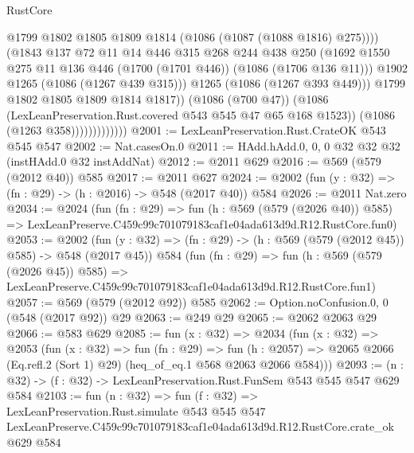\begin{lexlean}{RustCore}
\begin{coremodule}
                                    @1799
                                    @1802
                                    @1805
                                    @1809
                                    @1814
                                    (@1086 (@1087 (@1088 @1816) @275))))
                                (@1843
                                  @137
                                  @72
                                  @11
                                  @14
                                  @446
                                  @315
                                  @268
                                  @244
                                  @438
                                  @250
                                  (@1692
                                    @1550
                                    @275
                                    @11
                                    @136
                                    @446
                                    (@1700 (@1701 @446))
                                    (@1086 (@1706 @136 @11)))
                                  @1902
                                  @1265
                                  (@1086 (@1267 @439 @315)))
                                @1265
                                (@1086 (@1267 @393 @449)))
                              @1799
                              @1802
                              @1805
                              @1809
                              @1814
                              @1817))
                          (@1086 (@700 @47))
                          (@1086 (LexLeanPreservation.Rust.covered @543 @545 @47 @65 @168 @1523))
                          (@1086 (@1263 @358)))))))))))))
@2001 := LexLeanPreservation.Rust.CrateOK @543 @545 @547
@2002 := Nat.casesOn.{0}
@2011 := HAdd.hAdd.{0, 0, 0} @32 @32 @32 (instHAdd.{0} @32 instAddNat)
@2012 := @2011 @629
@2016 := @569 (@579 (@2012 @40)) @585
@2017 := @2011 @627
@2024 := @2002 (fun (y : @32) => (fn : @29) -> (h : @2016) -> @548 (@2017 @40)) @584
@2026 := @2011 Nat.zero
@2034 := @2024
    (fun (fn : @29) =>
    fun (h : @569 (@579 (@2026 @40)) @585) =>
    LexLeanPreserve.C459c99c701079183caf1e04ada613d9d.R12.RustCore.fun0)
@2053 := @2002
    (fun (y : @32) => (fn : @29) -> (h : @569 (@579 (@2012 @45)) @585) -> @548 (@2017 @45))
    @584
    (fun (fn : @29) =>
    fun (h : @569 (@579 (@2026 @45)) @585) =>
    LexLeanPreserve.C459c99c701079183caf1e04ada613d9d.R12.RustCore.fun1)
@2057 := @569 (@579 (@2012 @92)) @585
@2062 := Option.noConfusion.{0, 0} (@548 (@2017 @92)) @29
@2063 := @249 @29
@2065 := @2062 @2063 @29
@2066 := @583 @629
@2085 := fun (x : @32) =>
  @2034
    (fun (x : @32) =>
    @2053
      (fun (x : @32) =>
      fun (fn : @29) =>
      fun (h : @2057) =>
      @2065 @2066 (Eq.refl.{2} (Sort 1) @29) (heq_of_eq.{1} @568 @2063 @2066 @584)))
@2093 := (n : @32) -> (f : @32) -> LexLeanPreservation.Rust.FunSem @543 @545 @547 @629 @584
@2103 := fun (n : @32) =>
  fun (f : @32) =>
  LexLeanPreservation.Rust.simulate
    @543
    @545
    @547
    LexLeanPreserve.C459c99c701079183caf1e04ada613d9d.R12.RustCore.crate_ok
    @629
    @584
\end{coremodule}
\end{lexlean}
